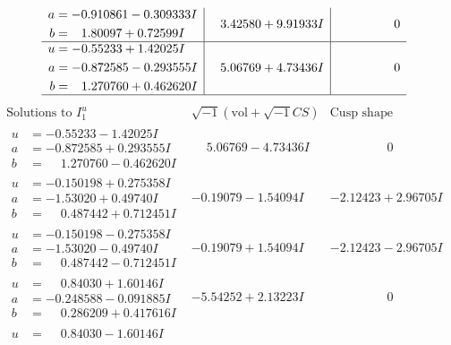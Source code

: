 \documentclass[1p]{elsarticle_modified}
\theoremstyle{definition}
\newcommand{\I}{\sqrt{-1}}
\begin{document}
$$\begin{array}{c|c|c}
\begin{aligned}
a &= -0.910861 - 0.309333 I \\
b &= \phantom{-}1.80097 + 0.72599 I\end{aligned}
 & \phantom{-}3.42580 + 9.91933 I & \phantom{-0.000000 } 0 \\ \hline\begin{aligned}
u &= -0.55233 + 1.42025 I \\
a &= -0.872585 - 0.293555 I \\
b &= \phantom{-}1.270760 + 0.462620 I\end{aligned}
 & \phantom{-}5.06769 + 4.73436 I & \phantom{-0.000000 } 0\\
 \hline 
 \end{array}$$\newpage$$\begin{array}{c|c|c}  
\text{Solutions to }I^u_{1}& \I (\text{vol} + \sqrt{-1}CS) & \text{Cusp shape}\\
 \hline 
\begin{aligned}
u &= -0.55233 - 1.42025 I \\
a &= -0.872585 + 0.293555 I \\
b &= \phantom{-}1.270760 - 0.462620 I\end{aligned}
 & \phantom{-}5.06769 - 4.73436 I & \phantom{-0.000000 } 0 \\ \hline\begin{aligned}
u &= -0.150198 + 0.275358 I \\
a &= -1.53020 + 0.49740 I \\
b &= \phantom{-}0.487442 + 0.712451 I\end{aligned}
 & -0.19079 - 1.54094 I & -2.12423 + 2.96705 I \\ \hline\begin{aligned}
u &= -0.150198 - 0.275358 I \\
a &= -1.53020 - 0.49740 I \\
b &= \phantom{-}0.487442 - 0.712451 I\end{aligned}
 & -0.19079 + 1.54094 I & -2.12423 - 2.96705 I \\ \hline\begin{aligned}
u &= \phantom{-}0.84030 + 1.60146 I \\
a &= -0.248588 - 0.091885 I \\
b &= \phantom{-}0.286209 + 0.417616 I\end{aligned}
 & -5.54252 + 2.13223 I & \phantom{-0.000000 } 0 \\ \hline\begin{aligned}
u &= \phantom{-}0.84030 - 1.60146 I \\

\end{aligned}
\end{array}$$
\end{document}
